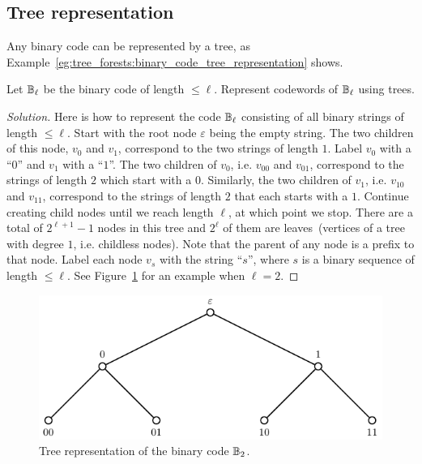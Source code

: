 
\subsection{Tree representation}

Any binary code can be represented by a tree, as
Example~\ref{eg:tree_forests:binary_code_tree_representation} shows.

\begin{example}
\label{eg:tree_forests:binary_code_tree_representation}
Let $\mathbb{B}_\ell$ be the binary code of length
$\leq \ell$. Represent codewords of $\mathbb{B}_\ell$ using trees.
\end{example}

\begin{proof}[Solution]
Here is how to represent the code $\mathbb{B}_\ell$ consisting of all binary
strings of length $\leq \ell$. Start with the
root node $\varepsilon$\index{$\varepsilon$}
being the empty string. The two children of this node, $v_0$ and
$v_1$, correspond to the two strings of length $1$. Label $v_0$ with a
``$0$'' and $v_1$ with a ``$1$''. The two children of $v_0$,
i.e. $v_{00}$ and $v_{01}$, correspond to the strings of length $2$
which start with a $0$. Similarly, the two children of $v_1$,
i.e. $v_{10}$ and $v_{11}$, correspond to the strings of length $2$
that each starts with a $1$. Continue creating child nodes until we
reach length $\ell$, at which point we stop. There are a total of
$2^{\ell + 1} - 1$ nodes in this tree and $2^\ell$ of them are
leaves~(vertices of a tree with degree $1$, i.e. childless
nodes). Note that the parent of any node is a prefix to that
node. Label each node $v_s$ with the string ``$s$'', where $s$ is a
binary sequence of length $\leq \ell$. See
Figure~\ref{fig:trees_forests:tree_representation_B_2} for an example
when $\ell = 2$.
\end{proof}

\begin{figure}[!htbp]
\centering
{}
\includegraphics{image/trees-forests/tree-representation-B-2}
\caption{Tree representation of the binary code $\mathbb{B}_2$.}
\label{fig:trees_forests:tree_representation_B_2}
\end{figure}

